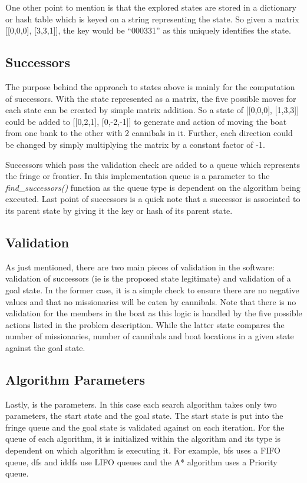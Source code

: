 \documentclass[journal]{IEEEtran}
\begin{document}
\noindent One other point to mention is that the explored states are stored in a 
dictionary or hash table which is keyed on a string representing the state. So given
a matrix [[0,0,0], [3,3,1]], the key would be ``000331'' as this uniquely identifies
the state. \medskip

\subsection{Successors}
\noindent The purpose behind the approach to states above is mainly for the computation
of successors. With the state represented as a matrix, the five possible moves for 
each state can be created by simple matrix addition. So a state of [[0,0,0], [1,3,3]]
could be added to [[0,2,1], [0,-2,-1]] to generate and action of moving the boat
from one bank to the other with 2 cannibals in it. Further, each direction could be 
changed by simply multiplying the matrix by a constant factor of -1. \smallskip

\noindent Successors which pass the validation check are added to a queue which represents
the fringe or frontier. In this implementation queue is a parameter to the
\textit{find\_successors()} function as the queue type is dependent on the algorithm 
being executed. Last point of successors is a quick note that a successor is associated to
its parent state by giving it the key or hash of its parent state. \medskip 

\subsection{Validation}
\noindent As just mentioned, there are two main pieces of validation in the software:
validation of successors (ie is the proposed state legitimate) and validation of a
goal state. In the former case, it is a simple check to ensure there are no negative
values and that no missionaries will be eaten by cannibals. Note that there is no 
validation for the members in the boat as this logic is handled by the five possible 
actions listed in the problem description. While the latter state compares the number
of missionaries, number of cannibals and boat locations in a given state against 
the goal state.\medskip


\subsection{Algorithm Parameters}
\noindent Lastly, is the parameters. In this case each search algorithm takes only
two parameters, the start state and the goal state. The start state is put into
the fringe queue and the goal state is validated against on each iteration. For the
queue of each algorithm, it is initialized within the algorithm and its type is dependent
on which algorithm is executing it. For example, bfs uses a FIFO queue, dfs and iddfs
use LIFO queues and the A* algorithm uses a Priority queue. \smallskip
\end{document}

